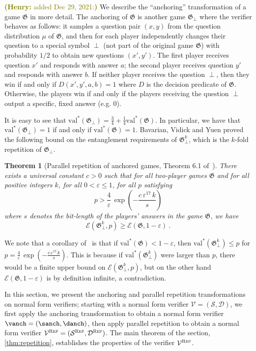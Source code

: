\documentclass[11pt]{article}
\newtheorem{theorem}{Theorem}[section]
\theoremstyle{definition}
\newcommand{\val}{\ensuremath{\mathrm{val}}}
\newcommand{\eps}{\varepsilon}
\newcommand{\game}{\mathfrak{G}}
\newcommand{\sampler}{\mathcal{S}}
\newcommand{\decider}{\mathcal{D}}
\newcommand{\verifier}{\mathcal{V}}
\newcommand{\gamestyle}[1]{\ensuremath{\textsc{#1}}\xspace}
\newcommand{\Ent}{\mathscr{E}}
\newcommand{\rep}{\gamestyle{Rep}}
\newcommand{\hnote}[1]{\textcolor{olive}{\small {\textbf{(Henry:} #1\textbf{) }}}}
\newcommand{\hnote}[1]{}
\begin{document}
\hnote{added Dec 29, 2021:} We describe the ``anchoring'' transformation of a game $\game$ in more detail. The anchoring of $\game$ is another game $\game_\perp$ where the verifier behaves as follows: it samples a question pair $(x,y)$ from the question distribution $\mu$ of
$\game$, and then for each player independently changes their question to a special symbol $\perp$ (not part of the original game $\game$) with probability $1/2$ to
obtain new questions $(x',y')$. The first player receives question $x'$ and responds with answer $a$; the second player receives question $y'$ and responds with answer $b$. If neither player receives the question $\perp$, then they win if and only if $D(x',y',a,b) = 1$ where $D$ is the decision predicate of $\game$. Otherwise, the players win if and only if the players receiving the question $\perp$ output a specific, fixed answer (e.g. $0$). 

It is easy to see that $\val^*(\game_\perp) = \frac{3}{4} + \frac{1}{4} \val^*(\game)$. In particular, we have that $\val^*(\game_\perp) = 1$ if and only if $\val^*(\game) = 1$. Bavarian, Vidick and Yuen proved the following bound on the entanglement requirements of $\game_\perp^k$, which is the $k$-fold repetition of $\game_\perp$. 

\begin{theorem}[Parallel repetition of anchored games, Theorem 6.1 of~\cite{bavarian2017hardness}]
\label{thm:bvy}
There exists a universal constant $c > 0$ such that for all two-player games $\game$ and for all positive integers $k$, for all $0 < \eps \leq 1$, for all $p$ satisfying
\[
 p > \frac{4}{\eps}\, \exp \left ( - \frac{c \, \eps^{17} \, k}{s} \right)
\]
where $s$ denotes the bit-length of the players' answers in the game $\game$, we have
\[
	\Ent(\game_\perp^k,p) \geq \Ent(\game,1-\eps)~.
\]
\end{theorem}
We note that a corollary of~ is that if $\val^*(\game) < 1 - \eps$, then $\val^*(\game_\perp^k) \leq p$ for $p = \frac{4}{\eps}\, \exp \left ( - \frac{c \, \eps^{17} \, k}{s} \right)$. This is because if $\val^*(\game_\perp^k)$ were larger than $p$, there would be a finite upper bound on $\Ent(\game_\perp^k,p)$, but on the other hand $\Ent(\game,1-\eps)$ is by definition infinite, a contradiction. 

In this section, we present the anchoring and parallel repetition transformations on normal form verifiers; starting with a normal form verifier $\verifier = (\sampler,\decider)$, we first apply the anchoring transformation to obtain a normal form verifier $\vanch = (\sanch,\danch)$, then apply parallel repetition to obtain a normal form verifier $\verifier^\rep = (\sampler^\rep,\decider^\rep)$. The main theorem of the section, \cref{thm:repetition}, establishes the properties of the verifier $\verifier^\rep$.
\end{document}
